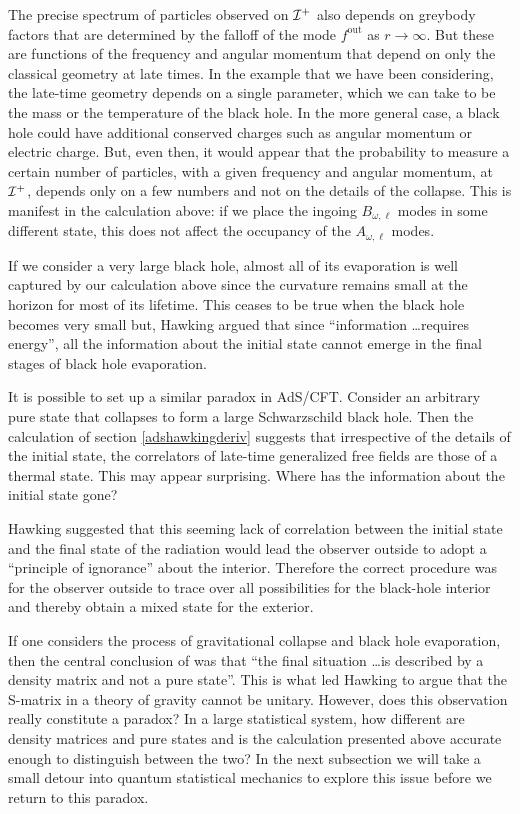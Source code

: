 \documentclass[12pt]{article}
\def\fout{f^{\text{out}}}
\def \scrip{{\cal I}^{+}}
\begin{document}
The precise spectrum of particles observed  on $\scrip$ also depends on greybody factors that are determined by the falloff of the mode $\fout$ as $r \rightarrow \infty$.  But these are functions of the frequency and angular momentum that depend on only the classical geometry at late times. In the example that we have been considering, the late-time geometry  depends on a single parameter, which we can take to be the mass or the temperature of the black hole. In 
the more general case, a black hole could have additional conserved charges such as angular momentum or electric charge. But, even then, it would appear that the probability to measure a certain number of particles, with a given frequency and angular momentum, at $\scrip$, depends only on a few numbers and not on the details of the collapse.  This is manifest in the calculation above:  if we place the 
ingoing $B_{\omega, \ell}$ modes in some different state, this does not affect the occupancy of the $A_{\omega,\ell}$ modes.

If we consider  a very large black hole, almost all of its evaporation is well captured by our calculation above since the curvature remains small at the horizon for most of its lifetime. This ceases to be true when the black hole
becomes very small but, Hawking argued that since ``information \ldots requires energy'', all the information about the initial state cannot emerge in the final stages of black hole evaporation. 





It is possible to set up a similar paradox in AdS/CFT. Consider an arbitrary pure state that collapses to form a large Schwarzschild black hole.  Then the calculation of  section \ref{adshawkingderiv} suggests that irrespective of the details of the  initial state, the correlators of late-time generalized free fields are those of a thermal state. This may appear surprising. Where has the information about the initial state gone? 

Hawking suggested that this seeming lack of correlation between the initial state and the final state of the radiation would lead the observer outside
to adopt a ``principle of ignorance'' about the interior. Therefore the correct procedure was
for the observer outside to trace over all possibilities for the black-hole interior and thereby obtain a mixed state for the exterior.



If one considers the process  of gravitational collapse and black hole evaporation, then the central conclusion of \cite{Hawking:1976ra} was that  ``the final situation \ldots is described by a density matrix and not a pure state''.  This is what led Hawking to argue that the S-matrix in a theory of gravity cannot be unitary.  However, does this observation really constitute a paradox? 
In a large statistical system, how different are density matrices and pure states and is the calculation presented above accurate enough to distinguish between the two? In the next subsection we will take a small detour into quantum statistical mechanics to explore this issue before we return to this  paradox.
\end{document}
